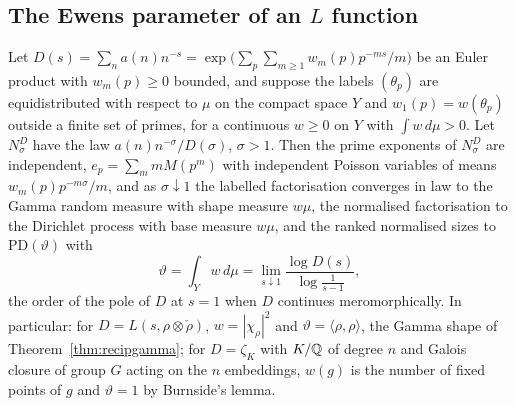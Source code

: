 \subsection{The Ewens parameter of an \texorpdfstring{$L$}{L} function}

\begin{theorem}\label{thm:pdewens}
Let $D(s)=\sum_na(n)n^{-s}=\exp\bigl(\sum_p\sum_{m\ge1}w_m(p)p^{-ms}/m\bigr)$ be an Euler product with $w_m(p)\ge0$ bounded, and suppose the labels $(\theta_p)$ are equidistributed with respect to $\mu$ on the compact space $Y$ and $w_1(p)=w(\theta_p)$ outside a finite set of primes, for a continuous $w\ge0$ on $Y$ with $\int w\,d\mu>0$. Let $N^D_\sigma$ have the law $a(n)n^{-\sigma}/D(\sigma)$, $\sigma>1$. Then the prime exponents of $N^D_\sigma$ are independent, $e_p=\sum_mmM(p^m)$ with independent Poisson variables of means $w_m(p)p^{-m\sigma}/m$, and as $\sigma\downarrow1$ the labelled factorisation converges in law to the Gamma random measure with shape measure $w\mu$, the normalised factorisation to the Dirichlet process with base measure $w\mu$, and the ranked normalised sizes to $\mathrm{PD}(\vartheta)$ with
\[
\vartheta=\int_Yw\,d\mu=\lim_{s\downarrow1}\frac{\log D(s)}{\log\frac1{s-1}},
\]
the order of the pole of $D$ at $s=1$ when $D$ continues meromorphically. In particular: for $D=L(s,\rho\otimes\check\rho)$, $w=|\chi_\rho|^2$ and $\vartheta=\langle\rho,\rho\rangle$, the Gamma shape of Theorem~\ref{thm:recipgamma}; for $D=\zeta_K$ with $K/\mathbb{Q}$ of degree $n$ and Galois closure of group $G$ acting on the $n$ embeddings, $w(g)$ is the number of fixed points of $g$ and $\vartheta=1$ by Burnside's lemma.
\end{theorem}


